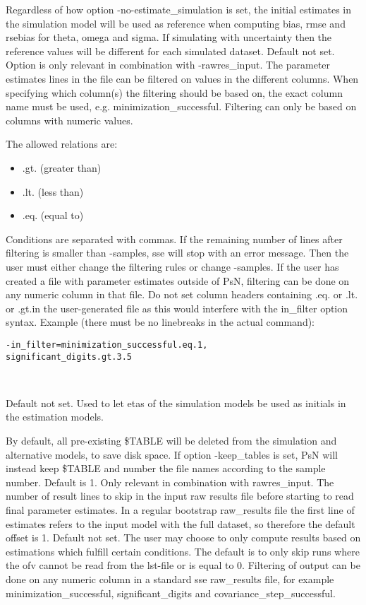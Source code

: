\begin{optionlist}
Regardless of how option -no-estimate\_simulation is set, the initial estimates in the simulation model will be used as reference when computing bias, rmse and rsebias for theta, omega and sigma. If simulating with uncertainty then the reference values will be different for each simulated dataset. 
\nextopt
{}
Default not set. Option is only relevant in combination with -rawres\_input. The parameter estimates lines in the file can be filtered on values in the different columns. When specifying which column(s) the filtering should be based on, the exact column name must be used, e.g. minimization\_successful. Filtering can only be based on columns with numeric values. 

The allowed relations are:
\begin{itemize}
	\item .gt. (greater than)
	\item .lt. (less than)
	\item .eq. (equal to)
\end{itemize}
Conditions are separated with commas. If the remaining number of lines after filtering is smaller than -samples,  sse will stop with an error message. Then the user must either change the filtering rules or change -samples. If the user has created a file with parameter estimates outside of PsN, filtering can be done on any numeric column in that file. Do not set column headers containing .eq. or .lt. or .gt.in the user-generated file as this would interfere with the in\_filter option syntax.
\newpage
Example (there must be no linebreaks in the actual command):
\begin{verbatim}
-in_filter=minimization_successful.eq.1,
significant_digits.gt.3.5
\end{verbatim} \\
\nextopt

    Default not set. Used to let etas of the
    simulation models be used as initials in the estimation models.
\nextopt

By default, all pre-existing \$TABLE will be deleted from the simulation and alternative models, to save disk space. If option -keep\_tables is set, 
PsN will instead keep \$TABLE and number the file names according to the sample number.
\nextopt
{}
Default is 1. Only relevant in combination with rawres\_input. The number of result lines to skip in the input raw results file before starting to read final parameter estimates. In a regular bootstrap raw\_results file the first line of estimates refers to the input model with the full dataset, so therefore the default offset is 1.
\nextopt
{}
Default not set. The user may choose to only compute results based on estimations which fulfill certain conditions. The default is to only skip runs where the ofv cannot be read from the lst-file or is equal to 0. Filtering of output can be done on any numeric column in a standard sse raw\_results file, for example minimization\_successful, significant\_digits 
and covariance\_step\_successful. 


\end{optionlist}
